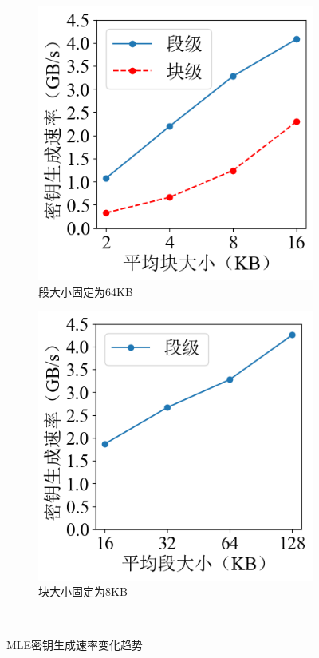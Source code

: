 \documentclass[promaster]{thesis-uestc}
\begin{document}
\begin{figure}
    \centering
    \begin{subfigure}{0.40\textwidth}
        \includegraphics[width=1\linewidth]{pic/gudingfenduan_1.png}
        \centering
        \captionsetup{width=\textwidth}
        \caption{段大小固定为64KB}
        \label{密钥生成速度1}
    \end{subfigure}
    \begin{subfigure}{0.405\textwidth}
        \includegraphics[width=1\linewidth]{pic/gudingfenkuai_1.png}
        \centering
        \captionsetup{width=\textwidth}
        \caption{块大小固定为8KB}
        \label{密钥生成速度2}
    \end{subfigure}\\

    \caption{MLE密钥生成速率变化趋势}
    \label{密钥生成速度}
\end{figure}
\end{document}
